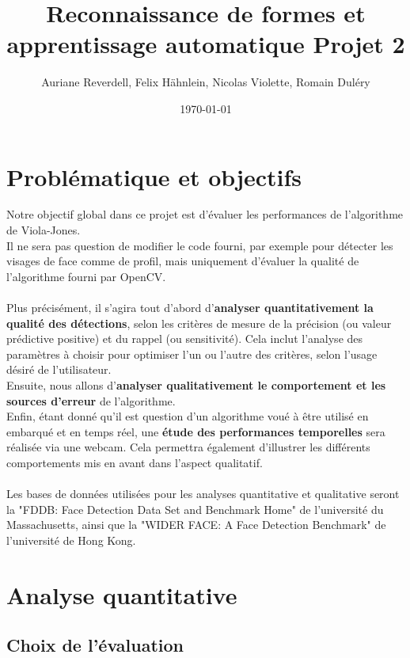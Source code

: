 \documentclass[a4paper,11pt]{article}
\title{Reconnaissance de formes et apprentissage automatique Projet 2}
\author{Auriane Reverdell, Felix Hähnlein, Nicolas Violette, Romain Duléry}
\date{\today}
\begin{document}
\maketitle
\vspace{1cm}

\section{Problématique et objectifs}

    Notre objectif global dans ce projet est d'évaluer les performances de l'algorithme de Viola-Jones.\\
    Il ne sera pas question de modifier le code fourni, par exemple pour détecter les visages de face comme de profil, mais uniquement d'évaluer la qualité de l'algorithme fourni par OpenCV.\\\\
    Plus précisément, il s'agira tout d'abord d'\textbf{analyser quantitativement la qualité des détections}, selon les critères de mesure de la précision (ou valeur prédictive positive) et du rappel (ou sensitivité). Cela inclut l'analyse des paramètres à choisir pour optimiser l'un ou l'autre des critères, selon l'usage désiré de l'utilisateur.\\
    Ensuite, nous allons d'\textbf{analyser qualitativement le comportement et les sources d'erreur} de l'algorithme.\\
    Enfin, étant donné qu'il est question d'un algorithme voué à être utilisé en embarqué et en temps réel, une \textbf{étude des performances temporelles} sera réalisée via une webcam. Cela permettra également d'illustrer les différents comportements mis en avant dans l'aspect qualitatif.\\\\
    Les bases de données utilisées pour les analyses quantitative et qualitative seront la "FDDB: Face Detection Data Set and Benchmark Home" de l'université du Massachusetts, ainsi que la "WIDER FACE: A Face Detection Benchmark" de l'université de Hong Kong. 

\section{Analyse quantitative}
    
    \subsection{Choix de l'évaluation}
        
\end{document}

